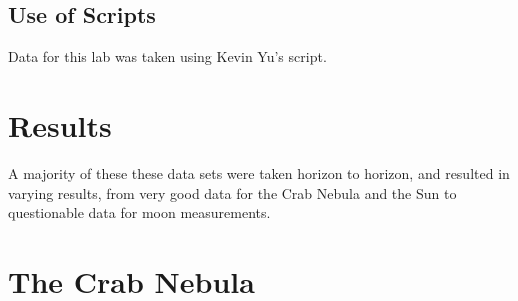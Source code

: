 \documentclass[12 pt]{article}
\begin{document}
\subsection*{Use of Scripts}
Data for this lab was taken using Kevin Yu's script.

\section*{Results}
A majority of these these data sets were taken horizon to horizon, and
resulted in varying results, from very good data for the Crab Nebula and
the Sun to questionable data for moon measurements. 

\section*{The Crab Nebula}
\end{document}
